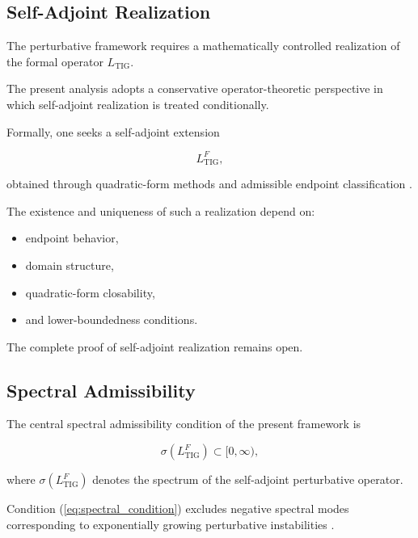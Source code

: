 
\subsection{Self-Adjoint Realization}

The perturbative framework requires a mathematically controlled realization of the formal operator $L_{\mathrm{TIG}}$.

The present analysis adopts a conservative operator-theoretic perspective in which self-adjoint realization is treated conditionally.

Formally, one seeks a self-adjoint extension

\begin{equation}
L_{\mathrm{TIG}}^{F},
\end{equation}

obtained through quadratic-form methods and admissible endpoint classification \cite{friedrichs1934,reedsimon2,reedsimon4,weidmann1987}.

The existence and uniqueness of such a realization depend on:
\begin{itemize}[leftmargin=0.6cm]
\item endpoint behavior,
\item domain structure,
\item quadratic-form closability,
\item and lower-boundedness conditions.
\end{itemize}

The complete proof of self-adjoint realization remains open.


\subsection{Spectral Admissibility}

The central spectral admissibility condition of the present framework is

\begin{equation}
\sigma(L_{\mathrm{TIG}}^{F})
\subset
[0,\infty),
\label{eq:spectral_condition}
\end{equation}

where $\sigma(L_{\mathrm{TIG}}^{F})$ denotes the spectrum of the self-adjoint perturbative operator.

Condition (\ref{eq:spectral_condition}) excludes negative spectral modes corresponding to exponentially growing perturbative instabilities \cite{davies1996,teschl2009}.

